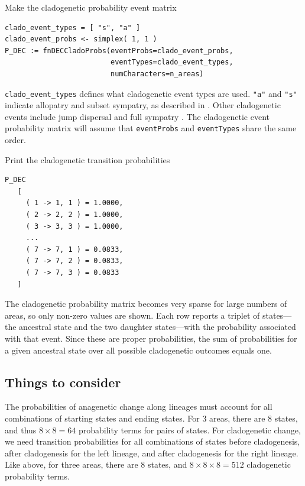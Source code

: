 Make the cladogenetic probability event matrix

\begin{snugshade}
\begin{lstlisting}
clado_event_types = [ "s", "a" ]
clado_event_probs <- simplex( 1, 1 )
P_DEC := fnDECCladoProbs(eventProbs=clado_event_probs,
                         eventTypes=clado_event_types,
                         numCharacters=n_areas)
\end{lstlisting}
\end{snugshade}

{\tt clado\_event\_types} defines what cladogenetic event types are used.
{\tt "a"} and {\tt "s"} indicate allopatry and subset sympatry, as described in \citep{Ree2005}.
Other cladogenetic events include jump dispersal \citep[{\tt "j"};][]{Matzke2012} and full sympatry \citep[{\tt "f"};][]{Landis2013a}.
The cladogenetic event probability matrix will assume that {\tt eventProbs} and {\tt eventTypes} share the same order.

Print the cladogenetic transition probabilities

\begin{snugshade}
\begin{lstlisting}
P_DEC
   [
     ( 1 -> 1, 1 ) = 1.0000,
     ( 2 -> 2, 2 ) = 1.0000,
     ( 3 -> 3, 3 ) = 1.0000,
     ...
     ( 7 -> 7, 1 ) = 0.0833,
     ( 7 -> 7, 2 ) = 0.0833,
     ( 7 -> 7, 3 ) = 0.0833
   ]
\end{lstlisting}
\end{snugshade}

The cladogenetic probability matrix becomes very sparse for large numbers of areas, so only non-zero values are shown.
Each row reports a triplet of states---the ancestral state and the two daughter states---with the probability associated with that event.
Since these are proper probabilities, the sum of probabilities for a given ancestral state over all possible cladogenetic outcomes equals one.

\subsection*{Things to consider}

The probabilities of anagenetic change along lineages must account for all combinations of starting states and ending states.
For 3 areas, there are 8 states, and thus $8 \times 8 = 64$ probability terms for pairs of states.
For cladogenetic change, we need transition probabilities for all combinations of states before cladogenesis, after cladogenesis for the left lineage, and after cladogenesis for the right lineage.
Like above, for three areas, there are 8 states, and $8 \times 8 \times 8 = 512$ cladogenetic probability terms.


